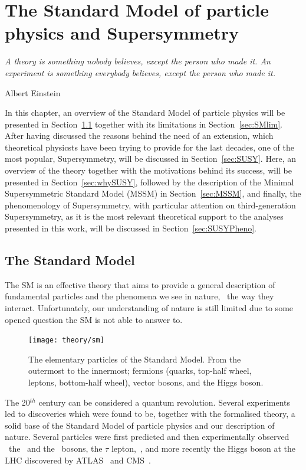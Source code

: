 \chapter{The Standard Model of particle physics and Supersymmetry}
\label{ch:theory} 
\epigraph{\emph{A theory is something nobody believes, except the person who made it. An experiment is something everybody believes, except the person who made it.}} {Albert Einstein}

	In this chapter, an overview of the Standard Model of particle physics will be presented in Section~\ref{sec:SMov} together with its limitations in Section~\ref{sec:SMlim}. After having discussed the reasons behind the need of an extension, which theoretical physicsts have been trying to provide for the last decades, one of the most popular, Supersymmetry, will be discussed in Section~\ref{sec:SUSY}. Here, an overview of the theory together with the motivations behind its success, will be presented in Section~\ref{sec:whySUSY}, followed by the description of the Minimal Supersymmetric Standard Model (MSSM) in Section~\ref{sec:MSSM}, and finally, the phenomenology of Supersymmetry, with particular attention on third-generation Supersymmetry, as it is the most relevant theoretical support to the analyses presented in this work, will be discussed in Section~\ref{sec:SUSYPheno}.

	


	\section{The Standard Model}
	\label{sec:SMov}

		The SM is an effective theory that aims to provide a general description of fundamental particles and the phenomena we see in nature, \ie\ the way they interact. Unfortunately, our understanding of nature is still limited due to some opened question the SM is not able to answer to.

		\begin{figure}
			\centering
				\texttt{[image: theory/sm]}
			\caption{\label{fig:sm_el_part} The elementary particles of the Standard Model. From the outermost to the innermost; fermions (quarks, top-half wheel, leptons, bottom-half wheel), vector bosons, and the Higgs boson.} %
		\end{figure}

		The 20$^{th}$ century can be considered a quantum revolution. Several experiments led to discoveries which were found to be, together with the formalised theory, a solid base of the Standard Model of particle physics and our description of nature. Several particles were first predicted and then experimentally observed \eg\ the \Wboson\ and the \Zboson\ bosons, the $\tau$ lepton,~\cite{Herrero1998}, and more recently the Higgs boson at the LHC discovered by ATLAS~\cite{ATLASHiggs2012} and CMS~\cite{CMSHiggs2012}.

